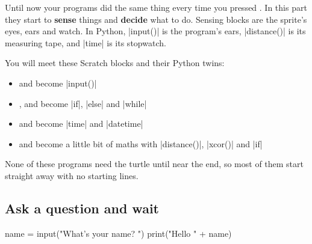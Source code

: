 
Until now your programs did the same thing every time you pressed \playbtn. In this part they start to \textbf{sense} things and \textbf{decide} what to do. Sensing blocks are the sprite's eyes, ears and watch. In Python, \py|input()| is the program's ears, \py|distance()| is its measuring tape, and \py|time| is its stopwatch.

You will meet these Scratch blocks and their Python twins:

\begin{itemize}
  \item {} and  become \py|input()|
  \item {},  and  become \py|if|, \py|else| and \py|while|
  \item {} and  become \py|time| and \py|datetime|
  \item {} and  become a little bit of maths with \py|distance()|, \py|xcor()| and \py|if|
\end{itemize}

None of these programs need the turtle until near the end, so most of them start straight away with no starting lines.

\subsection*{Ask a question and wait}

\begin{tcbraster}[raster columns=2, raster equal height=rows, raster column skip=12pt, raster valign=center, raster force size=false, raster column 1/.style={width=0.36\linewidth}, raster column 2/.style={width=0.64\linewidth-12pt}]
\begin{tcolorbox}[colback=white, colframe=white, boxrule=0pt, valign=center, left=0pt, right=0pt]
\begin{scratch}
\end{scratch}
\end{tcolorbox}
\begin{code}
name = input("What's your name? ")
print("Hello " + name)
\end{code}
\end{tcbraster}

